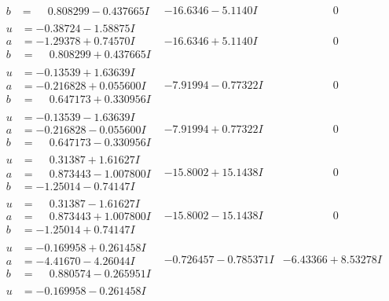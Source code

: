 \documentclass[1p]{elsarticle_modified}
\theoremstyle{definition}
\begin{document}
$$\begin{array}{c|c|c}
\begin{aligned}
b &= \phantom{-}0.808299 - 0.437665 I\end{aligned}
 & -16.6346 - 5.1140 I & \phantom{-0.000000 } 0 \\ \hline\begin{aligned}
u &= -0.38724 - 1.58875 I \\
a &= -1.29378 + 0.74570 I \\
b &= \phantom{-}0.808299 + 0.437665 I\end{aligned}
 & -16.6346 + 5.1140 I & \phantom{-0.000000 } 0 \\ \hline\begin{aligned}
u &= -0.13539 + 1.63639 I \\
a &= -0.216828 + 0.055600 I \\
b &= \phantom{-}0.647173 + 0.330956 I\end{aligned}
 & -7.91994 - 0.77322 I & \phantom{-0.000000 } 0 \\ \hline\begin{aligned}
u &= -0.13539 - 1.63639 I \\
a &= -0.216828 - 0.055600 I \\
b &= \phantom{-}0.647173 - 0.330956 I\end{aligned}
 & -7.91994 + 0.77322 I & \phantom{-0.000000 } 0 \\ \hline\begin{aligned}
u &= \phantom{-}0.31387 + 1.61627 I \\
a &= \phantom{-}0.873443 - 1.007800 I \\
b &= -1.25014 - 0.74147 I\end{aligned}
 & -15.8002 + 15.1438 I & \phantom{-0.000000 } 0 \\ \hline\begin{aligned}
u &= \phantom{-}0.31387 - 1.61627 I \\
a &= \phantom{-}0.873443 + 1.007800 I \\
b &= -1.25014 + 0.74147 I\end{aligned}
 & -15.8002 - 15.1438 I & \phantom{-0.000000 } 0 \\ \hline\begin{aligned}
u &= -0.169958 + 0.261458 I \\
a &= -4.41670 - 4.26044 I \\
b &= \phantom{-}0.880574 - 0.265951 I\end{aligned}
 & -0.726457 - 0.785371 I & -6.43366 + 8.53278 I \\ \hline\begin{aligned}
u &= -0.169958 - 0.261458 I \\

\end{aligned}
\end{array}$$
\end{document}
